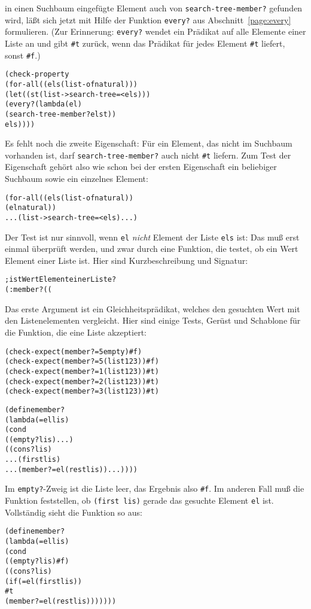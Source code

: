 in einen Suchbaum eingefügte Element auch von
\texttt{search-tree-member?} gefunden wird, läßt sich jetzt mit Hilfe
der Funktion \texttt{every?} aus Abschnitt~\ref{page:every}
formulieren.  (Zur Erinnerung: \texttt{every?} wendet ein Prädikat auf
alle Elemente einer Liste an und gibt \verb|#t| zurück, wenn das
Prädikat für jedes Element \verb|#t| liefert, sonst \verb|#f|.)
%
\begin{alltt}
(check-property
 (for-all ((els (list-of natural)))
   (let ((st (list->search-tree = < els)))
     (every? (lambda (el)
               (search-tree-member? el st))
             els))))
\end{alltt}
%
Es fehlt noch die zweite Eigenschaft: Für ein Element, das nicht im
Suchbaum vorhanden ist, darf \texttt{search-tree-member?} auch nicht
\verb|#t| liefern.  Zum Test der Eigenschaft gehört also wie schon bei
der ersten Eigenschaft ein beliebiger Suchbaum sowie ein einzelnes Element:
%
\begin{alltt}
(for-all ((els (list-of natural))
          (el natural))
  ... (list->search-tree = < els) ...)
\end{alltt}
%
Der Test ist nur sinnvoll, wenn \texttt{el} \emph{nicht} Element der Liste
\texttt{els} ist: Das muß erst einmal überprüft werden, und zwar durch
eine Funktion, die testet, ob ein Wert Element einer Liste ist.  Hier
sind Kurzbeschreibung und Signatur:
%
\begin{alltt}
; ist Wert Element einer Liste?
(: member? ((%a %a -> boolean) %a (list-of %a) -> boolean))
\end{alltt}
%
Das erste Argument ist ein Gleichheitsprädikat, welches den gesuchten
Wert mit den Listenelementen vergleicht.  Hier sind einige Tests,
Gerüst und Schablone für die Funktion, die eine Liste akzeptiert:
%
\begin{alltt}
(check-expect (member? = 5 empty) #f)
(check-expect (member? = 5 (list 1 2 3)) #f)
(check-expect (member? = 1 (list 1 2 3)) #t)
(check-expect (member? = 2 (list 1 2 3)) #t)
(check-expect (member? = 3 (list 1 2 3)) #t)

(define member?
  (lambda (= el lis)
    (cond
      ((empty? lis) ...)
      ((cons? lis)
       ... (first lis)
       ... (member? = el (rest lis)) ...))))
\end{alltt}
%
Im \texttt{empty?}-Zweig ist die Liste leer, das Ergebnis also
\verb|#f|.  Im anderen Fall muß die Funktion feststellen, ob
\texttt{(first lis)} gerade das gesuchte Element \texttt{el} ist.
Vollständig sieht die Funktion so aus:
%
\begin{alltt}
(define member?
  (lambda (= el lis)
    (cond
      ((empty? lis) #f)
      ((cons? lis)
       (if (= el (first lis))
           #t
           (member? = el (rest lis)))))))
\end{alltt}
